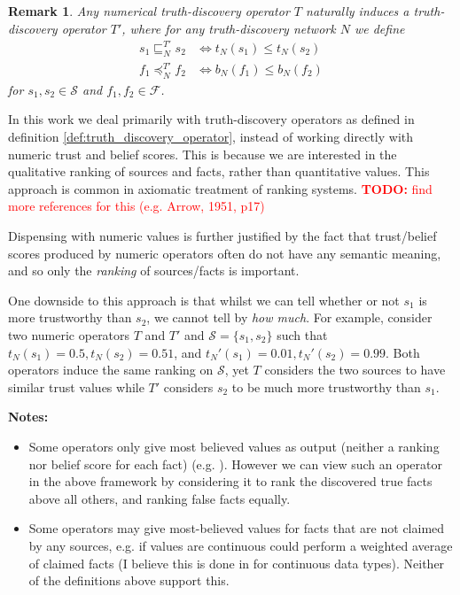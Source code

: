 \documentclass{article}
\theoremstyle{definition} \newtheorem{definition}{Definition}
\theoremstyle{definition} \newtheorem{example}{Example}
\theoremstyle{plain} \newtheorem{axiom}{Axiom}
\theoremstyle{plain} \newtheorem*{remark}{Remark}
\theoremstyle{remark} \newtheorem*{notation}{Notation}
\theoremstyle{plain} \newtheorem{lemma}{Lemma}
\theoremstyle{plain} \newtheorem{theorem}{Theorem}
\theoremstyle{plain} \newtheorem{proposition}{Proposition}
\newcommand{\todo}[1] {
    \textcolor{red}{
        \textbf{TODO:} #1
    }
}
\renewcommand{\S}{\mathcal{S}}  %
\newcommand{\F}{\mathcal{F}}
\newcommand{\sle}{\sqsubseteq}
\newcommand{\fle}{\preceq}
\begin{document}
\begin{remark}
    Any numerical truth-discovery operator $T$ naturally induces a
    truth-discovery operator $T'$, where for any truth-discovery network $N$
    we define
    \begin{align*}
    s_1 \sle_N^{T'} s_2 & \iff t_N(s_1) \le t_N(s_2) \\
    f_1 \fle_N^{T'} f_2 & \iff b_N(f_1) \le b_N(f_2)
    \end{align*}
    for $s_1, s_2 \in \S$ and $f_1, f_2 \in \F$.
\end{remark}

In this work we deal primarily with truth-discovery operators as defined in
definition \ref{def:truth_discovery_operator}, instead of working directly
with numeric trust and belief scores. This is because we are interested in the
qualitative ranking of sources and facts, rather than quantitative values. This
approach is common in axiomatic treatment of ranking
systems{\cite{altman,altman_personalised}}. \todo{find more references for this
(e.g. Arrow, 1951, p17)}

Dispensing with numeric values is further justified by the fact that
trust/belief scores produced by numeric operators often do not have any
semantic meaning\cite{pasternack}, and so only the \emph{ranking} of
sources/facts is important.

One downside to this approach is that whilst we can tell whether or not $s_1$
is more trustworthy than $s_2$, we cannot tell by \emph{how much}.  For
example, consider two numeric operators $T$ and $T'$ and $\S=\{s_1, s_2\}$
such that $t_N(s_1)=0.5, t_N(s_2)=0.51$, and $t_N'(s_1)=0.01,
t_N'(s_2)=0.99$. Both operators induce the same ranking on $\S$, yet $T$
considers the two sources to have similar trust values while $T'$ considers
$s_2$ to be much more trustworthy than $s_1$.

\textbf{Notes:}
\begin{itemize}

\item Some operators only give most believed values as output (neither a
ranking nor belief score for each fact) (e.g. \cite{li_conflicts}). However we
can view such an operator in the above framework by considering it to rank the
discovered true facts above all others, and ranking false facts equally.

\item Some operators may give most-believed values for facts that are not
claimed by any sources, e.g. if values are continuous could perform a weighted
average of claimed facts (I believe this is done in \cite{li_conflicts} for
continuous data types). Neither of the definitions above support this.

\end{itemize}
\end{document}
